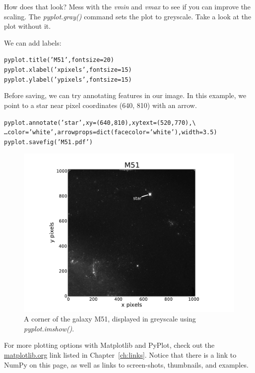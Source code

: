How does that look? Mess with the \textit{vmin} and \textit{vmax} to see if you can improve the scaling.
The \textit{pyplot.gray()} command sets the plot to greyscale. Take a look at the plot without it.

We can add labels:  

\begin{alltt}
\pytab pyplot.title('M51', fontsize=20)
\pytab pyplot.xlabel('x pixels', fontsize=15)
\pytab pyplot.ylabel('y pixels', fontsize=15)
\end{alltt}

Before saving, we can try annotating features in our image. In this example,
we point to a star near pixel coordinates (640, 810) with an arrow.

\begin{alltt}
\pytab pyplot.annotate('star', xy=(640,810),  xytext=(520,770), \textbackslash
\ldots color='white', arrowprops=dict(facecolor='white'), width=3.5)
\pytab pyplot.savefig('M51.pdf')
\end{alltt}

\begin{figure}[tbp]
  \centering
    \includegraphics[scale=0.70]{M51.pdf}
    \caption{A corner of the galaxy M51, displayed in greyscale using \textit{pyplot.imshow()}.}
  \label{fig:M51}
\end{figure}


For more
plotting options with Matplotlib and PyPlot, check out the 
\href{http://matplotlib.org/}{matplotlib.org} link listed in
Chapter~\ref{ch:links}.  Notice that there is a link to NumPy on this
page, as well as links to screen-shots, thumbnails, and examples.


